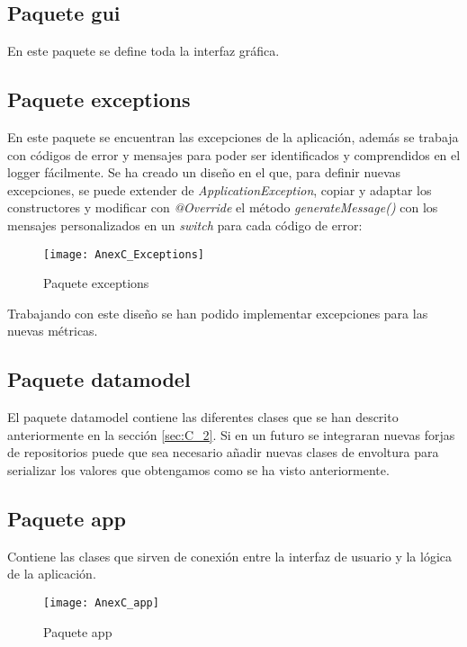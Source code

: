 

\subsection{Paquete gui}
En este paquete se define toda la interfaz gráfica.


\subsection{Paquete exceptions}
En este paquete se encuentran las excepciones de la aplicación, además se trabaja con códigos de error y mensajes para poder ser identificados y comprendidos en el logger fácilmente. Se ha creado un diseño en el que, para definir nuevas excepciones, se puede extender de \textit{ApplicationException}, copiar y adaptar los constructores y modificar con \textit{@Override} el método \textit{generateMessage()} con los mensajes personalizados en un \textit{switch} para cada código de error:

\begin{figure}[!h]
	\centering
	\texttt{[image: AnexC\_Exceptions]}
	\caption{Paquete exceptions}\label{fig:AnexC_Exceptions}
\end{figure}
\FloatBarrier

Trabajando con este diseño se han podido implementar excepciones para las nuevas métricas.

\subsection{Paquete datamodel}
El paquete datamodel contiene las diferentes clases que se han descrito anteriormente en la sección \ref{sec:C_2}. Si en un futuro se integraran nuevas forjas de repositorios puede que sea necesario añadir nuevas clases de envoltura para serializar los valores que obtengamos como se ha visto anteriormente.

\subsection{Paquete app}
Contiene las clases que sirven de conexión entre la interfaz de usuario y la lógica de la aplicación.

\begin{figure}[!h]
	\centering
	\texttt{[image: AnexC\_app]}
	\caption{Paquete app}\label{fig:AnexC_app}
\end{figure}
\FloatBarrier

